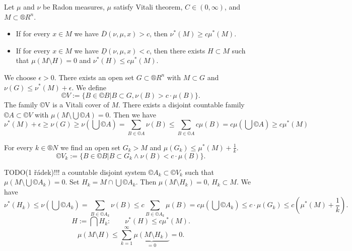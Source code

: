 \documentclass[12pt]{article}					%
\begin{document}
\begin{veta}
	Let $\mu$ and $\nu$ be Radon measures, $\mu$ satisfy Vitali theorem, $C \in (0, ∞)$, and $M \subset ®R^n$.
	\begin{itemize}
		\item If for every $x \in M$ we have $\overline{D}(\nu, \mu, x) > c$, then $\nu^*(M) ≥ c \mu^*(M)$.
		\item If for every $x \in M$ we have $\underline{D}(\nu, \mu, x) < c$, then there exists $H \subset M$ such that $\mu(M \setminus H) = 0$ and $\nu^*(H) ≤ c \mu^*(M)$.
	\end{itemize}
	
	\begin{dukazin}[1.]
		We choose $\epsilon > 0$. There exists an open set $G \subset ®R^n$ with $M \subset G$ and $\nu(G) ≤ \nu^*(M) + \epsilon$. We define
		$$ ©V := \{B \in ©B | B \subset G, \nu(B) > c·\mu(B)\}. $$
		The family ©V is a Vitali cover of $M$. There exists a disjoint countable family $©A \subset ©V$ with $\mu(M \setminus \bigcup ©A) = 0$. Then we have
		$$ \nu^*(M) + \epsilon ≥ \nu(G) ≥ \nu(\bigcup ©A) = \sum_{B \in ©A} \nu(B) ≤ \sum_{B \in ©A} c \mu(B) = c \mu(\bigcup ©A) ≥ c \mu^*(M) $$
	\end{dukazin}


	\begin{dukazin}[2.]
		For every $k \in ®N$ we find an open set $G_k > M$ and $\mu(G_k) ≤ \mu^*(M) + \frac{1}{k}$.
		$$ ©V_k := \{B \in ©B | B \subset G_k \land \nu(B) < c·\mu(B)\}. $$

		TODO(1 řádek)!!! a countable disjoint system $©A_k \subset ©V_k$ such that $\mu(M \setminus \bigcup ©A_k) = 0$. Set $H_k = M \cap \bigcup ©A_k$. Then $\mu(M \setminus H_k) = 0$, $H_k \subset M$. We have
		$$ \nu^*(H_k) ≤ \nu(\bigcup ©A_k) = \sum_{B \in ©A_k} \nu(B) ≤ c \sum_{B \in ©A_k} \mu(B) = c \mu(\bigcup ©A_k) ≤ c·\mu(G_k) ≤ c(\mu^*(M) + \frac{1}{k}). $$
		$$ H := \bigcap H_k: \qquad \nu^*(H) ≤ c\mu^*(M). $$
		$$ \mu(M \setminus H) ≤ \sum_{k=1}^∞ \underbrace{\mu(M \setminus H_k)}_{=0} = 0. $$
	\end{dukazin}
\end{veta}
\end{document}
